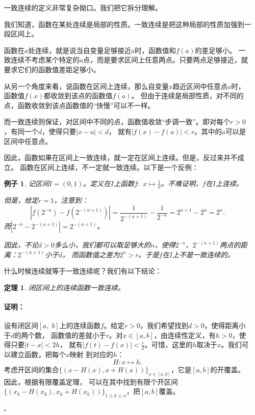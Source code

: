 \documentclass[12pt,UTF8]{ctexbook}
\newtheorem{tm}{定理}[section]
\newtheorem{ex}{例子}[section]
\renewenvironment{proof}{\paragraph{\textbf{证明：}}}{\hfill$\square$}
\begin{document}
\begin{appendix}
一致连续的定义非常复杂拗口。我们把它拆分理解。

我们知道，函数在某处连续是局部的性质。一致连续是把这种局部的性质加强到一段区间上。

函数在$a$处连续，就是说当自变量足够接近$a$时，函数值和$f(a)$的差足够小。
一致连续不考虑某个特定的$a$点，而是要求区间上任意两点。只要两点足够接近，就要求它们的函数值差距足够小。

从另一个角度来看，说函数在区间上连续，那么自变量$x$趋近区间中任意点$a$时，函数值$f(x)$都收敛到该点的函数值$f(a)$。
但由于连续是局部性质，对不同的点，函数收敛到该点函数值的“快慢”可以不一样。

而一致连续则保证，对区间中不同的点，函数值收敛“步调一致”。即对每个$r>0$，有同一个$d$，使得只要$|x - a| < d$，
就有$|f(x) - f(a)| < r$。其中的$a$可以是区间中任意点。

因此，函数如果在区间上一致连续，就一定在区间上连续。但是，反过来并不成立。
函数在区间上连续，不一定就一致连续。以下是一个反例：

\begin{ex}
    记区间$I = (0, 1)$。定义在$I$上函数$f: \,\,x \mapsto \frac{1}{x}$。不难证明，$f$在$I$上连续。

    但是，给定$r = 1$，注意到：
    $$ \left|f\left(2^{-n}\right) - f\left(2^{-(n+1)}\right)\right| = \frac{1}{2^{-(n+1)}} - \frac{1}{2^{-n}} = 2^{n+1} - 2^{n} = 2^n. $$
    而$\left|2^{-n} - 2^{-(n+1)}\right| = 2^{-(n+1)}$。

    因此，不论$d>0$多么小，我们都可以取足够大的$n$，使得$2^{-n}$、$2^{-(n+1)}$两点的距离：$2^{-(n+1)}$小于$d$，
    而函数值之差为$2^n > r$。于是$f$在$I$上不是一致连续的。
\end{ex}

什么时候连续就等于一致连续呢？我们有以下结论：

\begin{tm}
    闭区间上的连续函数一致连续。
\end{tm}
\begin{proof}
    设有闭区间$[a,\,\,b]$上的连续函数$f$。给定$r>0$，我们希望找到$d>0$，使得距离小于$d$的两个数，
    函数值的差就小于$r$。对$x\in[a, b]$，由连续性定义，有$h>0$，使得只要$|t - x| < 2h$，
    就有$|f(t) - f(x)| < \frac{r}{2}$。可惜，这里的$h$取决于$x$。我们可以建立函数，把每个$x$映射
    到对应的$h$：
    $$ H: x \mapsto h. $$
    考虑开区间的集合$\{(x - H(x), x + H(x))\}_{x\in[a, b]}$，它是$[a, b]$的开覆盖。因此，根据有限覆盖定理，
    可以在其中找到有限个开区间$\{(x_k - H(x_k), x_k + H(x_k))\}_{1\leqslant k\leqslant n}$，把$[a, b]$覆盖。
    

\end{proof}
\end{appendix}
\end{document}
